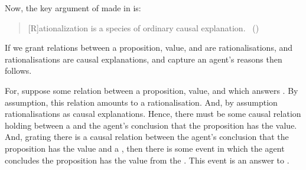 \begin{note}
  Now, the key argument of made in  is:
  \begin{quote}
    [R]ationalization is a species of ordinary causal explanation.%
    \mbox{ }\hfill\mbox{(\citeyear[685]{Davidson:1963aa})}
  \end{quote}

  If we grant relations between a proposition, value, and  are rationalisations, and rationalisations are causal explanations, and  capture an agent's reasons then \issueInclusion{} follows.

  For, suppose some relation between a proposition, value, and \pool{} which answers \qWhy{}.
  By assumption, this relation amounts to a rationalisation.
  And, by assumption rationalisations as causal explanations.
  Hence, there must be some causal relation holding between a  and the agent's conclusion that the proposition has the value.
  And, grating there is a causal relation between the agent's conclusion that the proposition has the value and a , then there is some event in which the agent concludes the proposition has the value from the .
  This event is an answer to \qHow{}.
\end{note}

